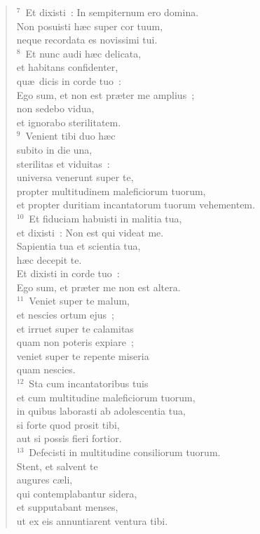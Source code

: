 \begin{verse}
${}^{7}$~Et dixisti~: In sempiternum ero domina.\\ Non posuisti h\ae c super cor tuum,\\ neque recordata es novissimi tui.\\
${}^{8}$~Et nunc audi h\ae c delicata,\\ et habitans confidenter,\\ qu\ae\ dicis in corde tuo~:\\ Ego sum, et non est pr\ae ter me amplius~;\\ non sedebo vidua,\\ et ignorabo sterilitatem.\\
${}^{9}$~Venient tibi duo h\ae c\\ subito in die una,\\ sterilitas et viduitas~:\\ universa venerunt super te,\\ propter multitudinem maleficiorum tuorum,\\ et propter duritiam incantatorum tuorum vehementem.\\
${}^{10}$~Et fiduciam habuisti in malitia tua,\\ et dixisti~: Non est qui videat me.\\ Sapientia tua et scientia tua,\\ h\ae c decepit te.\\ Et dixisti in corde tuo~:\\ Ego sum, et pr\ae ter me non est altera.\\
${}^{11}$~Veniet super te malum,\\ et nescies ortum ejus~;\\ et irruet super te calamitas\\ quam non poteris expiare~;\\ veniet super te repente miseria\\ quam nescies.\\
${}^{12}$~Sta cum incantatoribus tuis\\ et cum multitudine maleficiorum tuorum,\\ in quibus laborasti ab adolescentia tua,\\ si forte quod prosit tibi,\\ aut si possis fieri fortior.\\
${}^{13}$~Defecisti in multitudine consiliorum tuorum.\\ Stent, et salvent te\\ augures c\ae li,\\ qui contemplabantur sidera,\\ et supputabant menses,\\ ut ex eis annuntiarent ventura tibi.\\

\end{verse}
